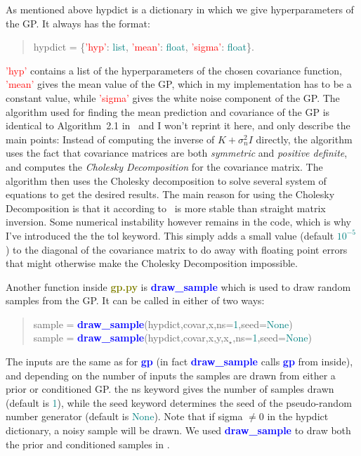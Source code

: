 \documentclass[a4paper,11pt,article,oneside]{memoir}
\newcommand{\pyt}[1]{\textbf{\textcolor{olive}{#1}}}
\newcommand{\dt}[1]{\textcolor{teal}{#1}}
\newcommand{\func}[1]{\textbf{\textcolor{blue}{#1}}}
\newcommand{\va}[1]{\textcolor{nicered}{#1}}
\newcommand{\red}[1]{\textcolor{red}{#1}}
\begin{document}
As mentioned above \va{hypdict} is a dictionary in which we give hyperparameters of the GP. It always has the format:
%
\begin{quote}
\va{hypdict} = \{\red{'hyp'}: \dt{list}, \red{'mean'}: \dt{float}, \red{'sigma'}: \dt{float}\}.
\end{quote}
%
\red{'hyp'} contains a list of the hyperparameters of the chosen covariance function, \red{'mean'} gives the mean value of the GP, which in my implementation has to be a constant value, while \red{'sigma'} gives the white noise component of the GP. The algorithm used for finding the mean prediction and covariance of the GP is identical to Algorithm~2.1 in~\cite[page~19]{rasmussen2006} and I won't reprint it here, and only describe the main points: Instead of computing the inverse of $K + \sigma_n^2 I$ directly, the algorithm uses the fact that covariance matrices are both \emph{symmetric} and \emph{positive definite}, and computes the \emph{Cholesky Decomposition} \cite{wiki:chol} for the covariance matrix. The algorithm then uses the Cholesky decomposition to solve several system of equations to get the desired results. The main reason for using the Cholesky Decomposition is that it according to~\cite{rasmussen2006} is more stable than straight matrix inversion. Some numerical instability however remains in the code, which is why I've introduced the the \va{tol} keyword. This simply adds a small value (default \dt{$10^{-5}$}) to the diagonal of the covariance matrix to do away with floating point errors that might otherwise make the Cholesky Decomposition impossible.

Another function inside \pyt{gp.py} is \func{draw\_sample} which is used to draw random samples from the GP. It can be called in either of two ways:
%
\begin{quote}
\va{sample} = \func{draw\_sample}(\va{hypdict},\va{covar},\va{x},\va{ns}=\dt{1},\va{seed}=\dt{None}) \\
\va{sample} = \func{draw\_sample}(\va{hypdict},\va{covar},\va{x},\va{y},\va{x$_\star$},\va{ns}=\dt{1},\va{seed}=\dt{None})
\end{quote}
%
The inputs are the same as for \func{gp} (in fact \func{draw\_sample} calls \func{gp} from inside), and depending on the number of inputs the samples are drawn from either a prior or conditioned GP. the \va{ns} keyword gives the number of samples drawn (default is \dt{1}), while the \va{seed} keyword determines the seed of the pseudo-random number generator (default is \dt{None}). Note that if \va{sigma} $\neq 0$ in the \va{hypdict} dictionary, a noisy sample will be drawn. We used \func{draw\_sample} to draw both the prior and conditioned samples in .
\end{document}
